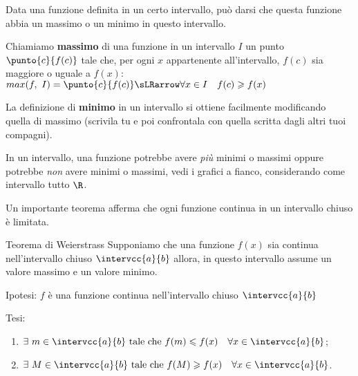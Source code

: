 Data una funzione definita in un certo intervallo, può darsi che questa 
funzione abbia un massimo o un minimo in questo intervallo.

\begin{newdef}{}{}
 Chiamiamo \textbf{massimo} di una funzione in un intervallo \(I\) un punto 
\(\punto{c}{f(c)}\) tale che, per ogni \(x\) appartenente all'intervallo, 
\(f(c)\) sia maggiore o uguale a \(f(x)\): \qquad
\(max(f,~I) = \punto{c}{f(c)} \sLRarrow \forall x \in I \quad
f(c) \geqslant f(x)\)
\end{newdef}

\begin{minipage}{.25\textwidth}
La definizione di \textbf{minimo} in un intervallo si ottiene facilmente 
modificando quella di massimo (scrivila tu e poi confrontala con quella 
scritta dagli altri tuoi compagni).

In un intervallo, una funzione potrebbe avere \emph{più} minimi o massimi 
oppure potrebbe \emph{non} avere minimi o massimi, vedi i grafici a fianco, 
considerando come intervallo tutto \(\R\).
\end{minipage}
\hfill
\begin{minipage}{.68\textwidth}
\begin{center} \contsinusoide \end{center}
\begin{center} \costante \contiperbole \end{center}
\end{minipage}

Un importante teorema afferma che ogni funzione continua in un intervallo 
chiuso è limitata.

\begin{newtheo}{Teorema di Weierstrass}{}
Supponiamo che una funzione \(f(x)\) sia continua nell'intervallo chiuso
\(\intervcc{a}{b}\) allora, in questo intervallo assume un valore massimo e 
un valore minimo.
\end{newtheo}


\noindent Ipotesi: \quad 
\(f\) è una funzione continua nell'intervallo chiuso \(\intervcc{a}{b}\)

\noindent Tesi: 
\begin{enumerate}[nosep]
 \item \(\exists~m \in \intervcc{a}{b} \text{ tale che }
         f(m) \leqslant f(x) \quad \forall x \in \intervcc{a}{b}\);
 \item \(\exists~M \in \intervcc{a}{b} \text{ tale che }
         f(M) \geqslant f(x) \quad \forall x \in \intervcc{a}{b}\).
\end{enumerate}

